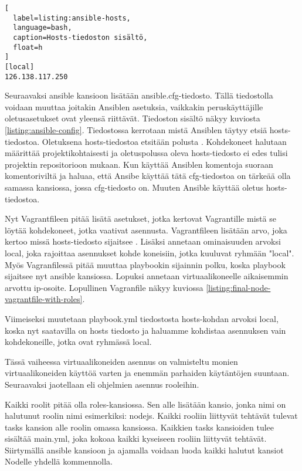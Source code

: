 \begin{lstlisting}[
  label=listing:ansible-hosts,
  language=bash,
  caption=Hosts-tiedoston sisältö,
  float=h
]
[local]
126.138.117.250
\end{lstlisting}

Seuraavaksi ansible kansioon lisätään ansible.cfg-tiedosto. Tällä tiedostolla voidaan muuttaa joitakin Ansiblen asetuksia, vaikkakin peruskäyttäjille oletusasetukset ovat yleensä riittävät. Tiedoston sisältö näkyy kuviosta \ref{listing:ansible-config}. Tiedostossa kerrotaan mistä Ansiblen täytyy etsiä hosts-tiedostoa. Oletuksena hosts-tiedostoa etsitään polusta  \cite{link:ansible-inventory}. Kohdekoneet halutaan määrittää projektikohtaisesti ja oletuspolussa oleva hosts-tiedosto ei edes tulisi projektin repositorioon mukaan. Kun käyttää Ansiblen komentoja suoraan komentoriviltä ja haluaa, että Ansibe käyttää tätä cfg-tiedostoa on tärkeää olla samassa kansiossa, jossa cfg-tiedosto on. Muuten Ansible käyttää oletus hosts-tiedostoa.

Nyt Vagrantfileen pitää lisätä asetukset, jotka kertovat Vagrantille  mistä se löytää kohdekoneet, jotka vaativat asennusta. Vagrantfileen lisätään  arvo, joka kertoo missä hosts-tiedosto sijaitsee \cite{link:vagrant-ansible-settings}. Lisäksi annetaan  ominaisuuden arvoksi local, joka rajoittaa asennukset kohde koneisiin, jotka kuuluvat ryhmään "local". Myös Vagranfilessä pitää muuttaa playbookin sijainnin polku, koska playbook sijaitsee nyt ansible kansiossa. Lopuksi annetaan virtuaalikoneelle aikaisemmin arvottu ip-osoite. Lopullinen Vagranfile näkyy kuviossa \ref{listing:final-node-vagrantfile-with-roles}.

Viimeiseksi muutetaan playbook.yml tiedostosta hosts-kohdan arvoksi local, koska nyt saatavilla on hosts tiedosto ja haluamme kohdistaa asennuksen vain kohdekoneille, jotka ovat ryhmässä local.

Tässä vaiheessa virtuaalikoneiden asennus on valmisteltu monien virtuaalikoneiden käyttöä varten ja enemmän parhaiden käytäntöjen suuntaan. Seuraavaksi jaotellaan eli ohjelmien asennus rooleihin.

Kaikki roolit pitää olla roles-kansiossa. Sen alle lisätään kansio, jonka nimi on halutunut roolin nimi esimerkiksi: nodejs. Kaikki rooliin liittyvät tehtävät tulevat tasks kansion alle roolin omassa kansiossa. Kaikkien tasks kansioiden tulee sisältää main.yml, joka kokoaa kaikki kyseiseen rooliin liittyvät tehtävät. Siirtymällä ansible kansioon ja ajamalla  voidaan luoda kaikki halutut kansiot Nodelle yhdellä kommennolla.

